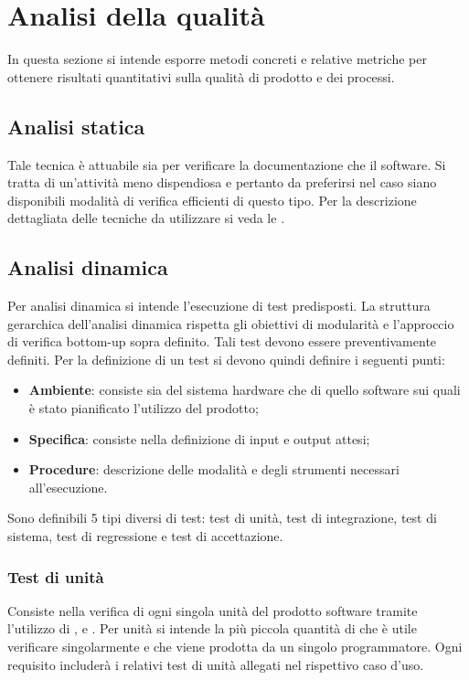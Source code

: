 \documentclass[12pt,a4paper]{article}
\begin{document}
\newpage

\section{Analisi della qualità}\label{analisi}
In questa sezione si intende esporre metodi concreti e relative metriche per ottenere risultati quantitativi sulla qualità di prodotto e dei processi. 

\subsection{Analisi statica}
Tale tecnica è attuabile sia per verificare la documentazione che il software. Si tratta di un'attività meno dispendiosa e pertanto da preferirsi nel caso siano disponibili modalità di verifica efficienti di questo tipo. Per la descrizione dettagliata delle tecniche da utilizzare si veda le \NdP.

\subsection{Analisi dinamica}
Per analisi dinamica si intende l'esecuzione di test predisposti. La struttura gerarchica dell'analisi dinamica rispetta gli obiettivi di modularità e l'approccio di verifica bottom-up sopra definito. Tali test devono essere preventivamente definiti.
Per la definizione di un test si devono quindi definire i seguenti punti:
\begin{itemize}
	\item \textbf{Ambiente}: consiste sia del sistema hardware che di quello software sui quali è stato pianificato l’utilizzo del prodotto;
	\item \textbf{Specifica}: consiste nella definizione di input e output attesi;
	\item \textbf{Procedure}: descrizione delle modalità e degli strumenti necessari all'esecuzione.
\end{itemize}
Sono definibili 5 tipi diversi di test: test di unità, test di integrazione, test di sistema, test di regressione e test di accettazione.

\subsubsection{Test di unità}
Consiste nella verifica di ogni singola unità del prodotto software tramite l’utilizzo di ,  e .
Per unità si intende la più piccola quantità di  che è utile verificare singolarmente e che viene prodotta da un singolo programmatore.
Ogni requisito includerà i relativi test di unità allegati nel rispettivo caso d'uso.
\end{document}
